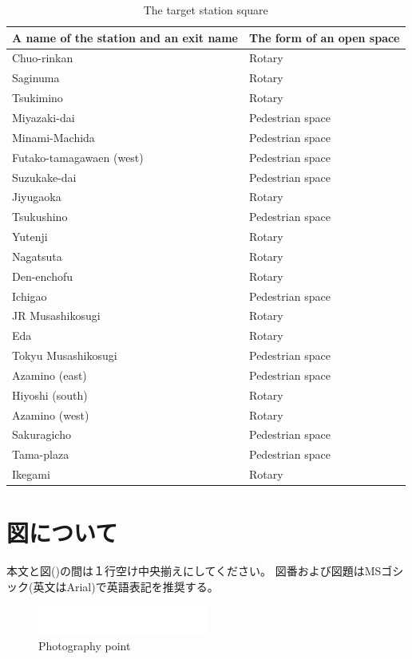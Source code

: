 \documentclass[base=8.8pt,magstyle=real,a4paper,twocolumn,xelatex,pandoc,jafont=ms]{bxjsarticle}
\begin{document}
\begin{table}[H]
\caption{The target station square}
\small
\centering
\begin{tabular}{p{35mm}|p{35mm}}
	\hline 
	A name of the station and an exit name
 & The form of an open space
\\ 
	\hline \hline
	Chuo-rinkan & Rotary\\
	Saginuma & Rotary\\
	Tsukimino & Rotary\\
	Miyazaki-dai& Pedestrian space\\
	Minami-Machida& Pedestrian space\\
	Futako-tamagawaen (west)&Pedestrian space\\
	Suzukake-dai&Pedestrian space\\
	Jiyugaoka&Rotary\\
	Tsukushino&Pedestrian space\\
	Yutenji&Rotary\\
	Nagatsuta&Rotary\\
	Den-enchofu&Rotary\\
	Ichigao&Pedestrian space\\
	JR Musashikosugi&Rotary\\
	Eda&Rotary\\
	Tokyu Musashikosugi&	Pedestrian space\\
	Azamino (east)&Pedestrian space\\
	Hiyoshi (south)&Rotary\\
	Azamino (west)&Rotary\\
	Sakuragicho&Pedestrian space\\
	Tama-plaza&Pedestrian space\\
	Ikegami&Rotary\\
	\hline 
\end{tabular} 
\end{table}

\section{図について}
本文と図()の間は１行空け中央揃えにしてください。
図番および図題はMSゴシック(英文はArial)で英語表記を推奨する。
\begin{figure}[h]
	\centering
	\includegraphics[width=1\linewidth]{../figure/figure1}
	\caption{Photography point}
	\label{fig:figure1}
\end{figure}
\end{document}
